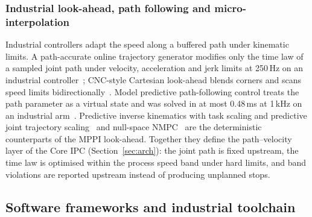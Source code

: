 \documentclass{plan4ari_report}
\begin{document}
\subsubsection{Industrial look-ahead, path following and micro-interpolation}
Industrial controllers adapt the speed along a buffered path under kinematic limits. A path-accurate online trajectory generator modifies only the time law of a sampled joint path under velocity, acceleration and jerk limits at 250\,Hz on an industrial controller~\cite{lange2016pathaccurate}; CNC-style Cartesian look-ahead blends corners and scans speed limits bidirectionally~\cite{ma2025lookahead}. Model predictive path-following control treats the path parameter as a virtual state and was solved in at most 0.48\,ms at 1\,kHz on an industrial arm~\cite{faulwasser2017pathfollowing}. Predictive inverse kinematics with task scaling and predictive joint trajectory scaling~\cite{faroni2019pik,faroni2020scaling} and null-space NMPC~\cite{sun2024nullspacempc} are the deterministic counterparts of the MPPI look-ahead. Together they define the path--velocity layer of the Core IPC (Section~\ref{sec:arch}): the joint path is fixed upstream, the time law is optimised within the process speed band under hard limits, and band violations are reported upstream instead of producing unplanned stops.

\subsection{Software frameworks and industrial toolchain}\label{sec:software}
\end{document}

